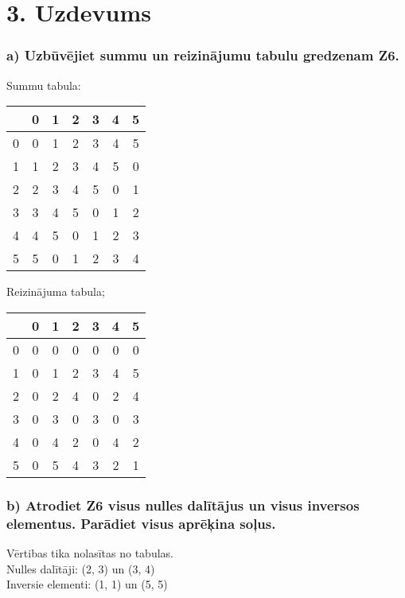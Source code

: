 \documentclass{article}
\begin{document}
\section*{3. Uzdevums}
\subsubsection*{a) Uzbūvējiet summu un reizinājumu tabulu gredzenam Z6.}

Summu tabula:
\begin{center}
    \begin{tabular}{ c | c c c c c c }
          & 0 & 1 & 2 & 3 & 4 & 5 \\
        \hline
        0 & 0 & 1 & 2 & 3 & 4 & 5 \\
        1 & 1 & 2 & 3 & 4 & 5 & 0 \\
        2 & 2 & 3 & 4 & 5 & 0 & 1 \\
        3 & 3 & 4 & 5 & 0 & 1 & 2 \\
        4 & 4 & 5 & 0 & 1 & 2 & 3 \\
        5 & 5 & 0 & 1 & 2 & 3 & 4 \\
    \end{tabular}
\end{center}
Reizinājuma tabula;
\begin{center}
    \begin{tabular}{ c | c c c c c c }
          & 0 & 1 & 2 & 3 & 4 & 5 \\
        \hline
        0 & 0 & 0 & 0 & 0 & 0 & 0 \\
        1 & 0 & 1 & 2 & 3 & 4 & 5 \\
        2 & 0 & 2 & 4 & 0 & 2 & 4 \\
        3 & 0 & 3 & 0 & 3 & 0 & 3 \\
        4 & 0 & 4 & 2 & 0 & 4 & 2 \\
        5 & 0 & 5 & 4 & 3 & 2 & 1 \\
    \end{tabular}
\end{center}

\subsubsection*{b) Atrodiet Z6 visus nulles dalītājus un visus inversos elementus. Parādiet visus aprēķina soļus.}

Vērtibas tika nolasītas no tabulas.\\
Nulles dalītāji: (2, 3) un (3, 4)\\
Inversie elementi: (1, 1) un (5, 5)
\end{document}
